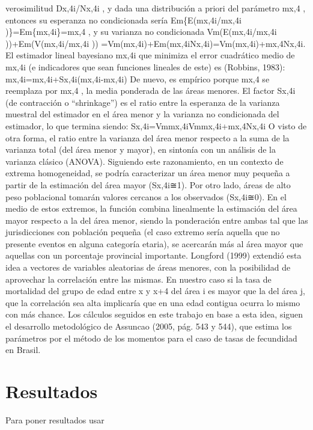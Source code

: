 \documentclass[12pt,spanish,]{article}
\begin{document}
verosimilitud Dx,4i/Nx,4i , y dada una distribución a priori del
parámetro mx,4 , entonces su esperanza no condicionada sería
Em\{E(mx,4i/mx,4i )\}=Em\{mx,4i\}=mx,4 , y su varianza no condicionada
Vm(E(mx,4i/mx,4i ))+Em(V(mx,4i/mx,4i ))
=Vm(mx,4i)+Em(mx,4iNx,4i)=Vm(mx,4i)+mx,4Nx,4i. El estimador lineal
bayesiano mx,4i que minimiza el error cuadrático medio de mx,4i (e
indicadores que sean funciones lineales de este) es (Robbins, 1983):
mx,4i=mx,4i+Sx,4i(mx,4i-mx,4i) De nuevo, es empírico porque mx,4 se
reemplaza por mx,4 , la media ponderada de las áreas menores. El factor
Sx,4i (de contracción o \enquote{shrinkage}) es el ratio entre la
esperanza de la varianza muestral del estimador en el área menor y la
varianza no condicionada del estimador, lo que termina siendo:
Sx,4i=Vmmx,4iVmmx,4i+mx,4Nx,4i O visto de otra forma, el ratio entre la
varianza del área menor respecto a la suma de la varianza total (del
área menor y mayor), en sintonía con un análisis de la varianza clásico
(ANOVA). Siguiendo este razonamiento, en un contexto de extrema
homogeneidad, se podría caracterizar un área menor muy pequeña a partir
de la estimación del área mayor (Sx,4i≅1). Por otro lado, áreas de alto
peso poblacional tomarán valores cercanos a los observados (Sx,4i≅0). En
el medio de estos extremos, la función combina linealmente la estimación
del área mayor respecto a la del área menor, siendo la ponderación entre
ambas tal que las jurisdicciones con población pequeña (el caso extremo
sería aquella que no presente eventos en alguna categoría etaria), se
acercarán más al área mayor que aquellas con un porcentaje provincial
importante. Longford (1999) extendió esta idea a vectores de variables
aleatorias de áreas menores, con la posibilidad de aprovechar la
correlación entre las mismas. En nuestro caso si la tasa de mortalidad
del grupo de edad entre x y x+4 del área i es mayor que la del área j,
que la correlación sea alta implicaría que en una edad contigua ocurra
lo mismo con más chance. Los cálculos seguidos en este trabajo en base a
esta idea, siguen el desarrollo metodológico de Assuncao (2005, pág. 543
y 544), que estima los parámetros por el método de los momentos para el
caso de tasas de fecundidad en Brasil.

\hypertarget{resultados}{%
\section{Resultados}\label{resultados}}

Para poner resultados usar
\end{document}
